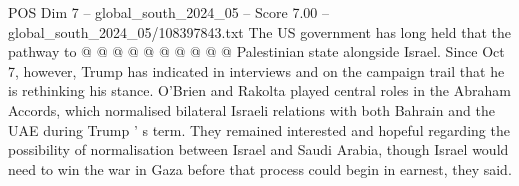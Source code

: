 \begin{textsample}{POS Dim 7 – global\_south\_2024\_05 – Score 7.00 – global\_south\_2024\_05/108397843.txt}
The US government has long held that the pathway to @ @ @ @ @ @ @ @ @ @ Palestinian state alongside Israel.
Since Oct 7, however, Trump has indicated in interviews and on the campaign trail that he is rethinking his stance.
O'Brien and Rakolta played central roles in the Abraham Accords, which normalised bilateral Israeli relations with both Bahrain and the UAE during Trump ' s term.
They remained interested and hopeful regarding the possibility of normalisation between Israel and Saudi Arabia, though Israel would need to win the war in Gaza before that process could begin in earnest, they said.

\end{textsample}

